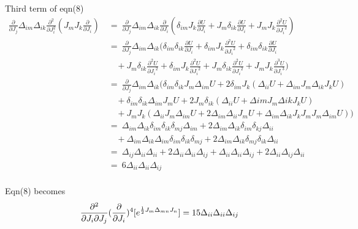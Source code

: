 \documentclass[12pt, letterpaper]{article}
\newcommand*{\1}{\hspace{1pt}}
\begin{document}
    Third term of eqn(8)
    \begin{align*}
        \frac{\partial}{\partial J_{j}}\Delta_{im}\Delta_{ik}\frac{\partial ^2}{{\partial J_{i}^2}}(J_{m}J_{k}\frac{\partial}{\partial J_{i}}) \ & = \ \frac{\partial}{\partial J_{j}}\Delta_{im}\Delta_{ik}\frac{\partial }{\partial J_{i}} (\delta_{im}J_{k}\frac{\partial U}{\partial J_{i}} + J_{m}\delta_{ik}\frac{\partial U}{\partial J_{i}} +J_{m}J_{k}\frac{\partial ^2 U}{{\partial J_{i}}^2}) \\
        & = \ \frac{\partial}{\partial J_{j}}\Delta_{im}\Delta_{ik}(\delta_{im}\delta_{ik}\frac{\partial U}{\partial J_{i}} + \delta_{im}J_{k}\frac{\partial ^2 U}{{\partial J_{i}}^2} + \delta_{im}\delta_{ik}\frac{\partial U}{\partial J_{i}}  \\
        & \ \ \ \ + J_{m}\delta_{ik}\frac{\partial ^2 U }{{\partial J_{i}}^2} + \delta_{im} J_{k}\frac{\partial ^2 U}{{\partial J_{i}}^2} + J_{m}\delta_{ik}\frac{\partial ^2 U}{{\partial J_{i}}^2} + J_{m}J_{k}\frac{\partial ^3 U}{{\partial J_{i}}^3}) \\
        & = \ \frac{\partial}{\partial J_{j}}\Delta_{im}\Delta_{ik}(\delta_{im}\delta_{ik}J_{m}\Delta_{im}U + 2\delta_{im}J_{k}(\Delta_{ii}U + \Delta_{im}J_{m}\Delta_{ik}J_{k}U) \\
        & \ \ \ \ + \delta_{im}\delta_{ik}\Delta_{im}J_{m}U + 2J_{m}\delta_{ik}(\Delta_{ii}U + \Delta{im}J_{m}\Delta{ik}J_{k}U) \\ 
        & \ \ \ \ + J_{m}J_{k}(\Delta_{ii}J_{m}\Delta_{im}U + 2\Delta_{im}\Delta_{ii}J_{m}U + \Delta_{im}\Delta_{ik}J_{k}J_{m}J_{m}\Delta_{im}U)) \\ 
        & = \ \Delta_{im}\Delta_{ik}\delta_{im}\delta_{ik}\delta_{mj}\Delta_{im} + 2\Delta_{im}\Delta_{ik}\delta_{im}\delta_{kj}\Delta_{ii} \\ 
        & \ \ \ \ + \Delta_{im}\Delta_{ik}\Delta_{im}\delta_{im}\delta_{ik}\delta_{mj} + 2\Delta_{im}\Delta_{ik}\delta_{mj}\delta_{ik}\Delta_{ii} \\ \tag*{[putting J=0]}
        & = \ \Delta_{ij}\Delta_{ii}\Delta_{ii} + 2\Delta_{ii}\Delta_{ii}\Delta_{ij} + \Delta_{ii}\Delta_{ii}\Delta_{ij} + 2\Delta_{ii}\Delta_{ij}\Delta_{ii} \\
        & = \ 6\Delta_{ii}\Delta_{ii}\Delta_{ij}\\ 
    \end{align*}

    Eqn(8) becomes
    \begin{equation}
       \frac{\partial ^{2}}{\partial J_{i} \partial J_{j}}(\frac{\partial}{\partial J_{i}})^{4} [e^{\frac{1}{2} J_{m} \Delta _{mn} J_{n}}] = 15\Delta_{ii}\Delta_{ii}\Delta_{ij}\\ 
    \end{equation}
\end{document}
